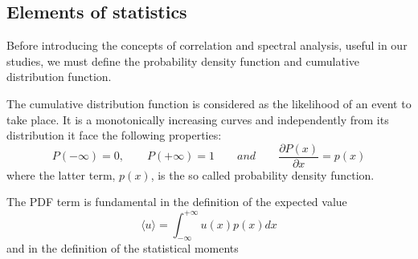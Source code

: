 \subsection{Elements of statistics}
Before introducing the concepts of correlation and spectral analysis, useful in our studies, we must define the probability density function and cumulative distribution function. \par
The cumulative distribution function is considered as the likelihood of an event to take place. It is a monotonically increasing curves and independently from its distribution it face the following properties:
\begin{equation}
P(-\infty) = 0, \qquad P(+\infty) = 1 \qquad and \qquad \frac{\partial P(x)}{\partial x} = p(x)
\end{equation}
where the latter term, $p(x)$, is the so called probability density function.
\par
The PDF term is fundamental in the definition of the expected value
\begin{equation}
\langle u \rangle = \int_{-\infty}^{+\infty} u(x) p(x) dx
\end{equation}
and in the definition of the statistical moments



